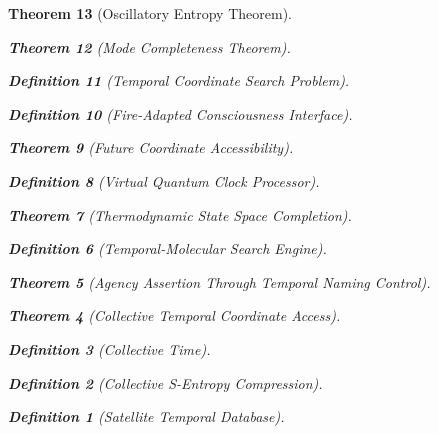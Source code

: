 \documentclass[12pt,a4paper]{article}
\newtheorem{theorem}{Theorem}[section]
\newtheorem{definition}[theorem]{Definition}
\begin{document}
\begin{theorem}[Oscillatory Entropy Theorem]
\begin{theorem}[Mode Completeness Theorem]
\begin{enumerate}
\begin{definition}[Temporal Coordinate Search Problem]
\begin{algorithm}
\begin{definition}[Fire-Adapted Consciousness Interface]
\begin{theorem}[Future Coordinate Accessibility]
\begin{definition}[Virtual Quantum Clock Processor]
\begin{itemize}
\begin{itemize}
\begin{theorem}[Thermodynamic State Space Completion]
\begin{definition}[Temporal-Molecular Search Engine]
\begin{theorem}[Agency Assertion Through Temporal Naming Control]
\begin{remark}
\begin{theorem}[Collective Temporal Coordinate Access]
\begin{definition}[Collective Time]
\begin{definition}[Collective S-Entropy Compression]
\begin{definition}[Satellite Temporal Database]
\begin{algorithm}
\begin{table}[h]
{{\begin{figure}[h]
\end{figure}}}
\end{table}
\end{algorithm}
\end{definition}
\end{definition}
\end{definition}
\end{theorem}
\end{remark}
\end{theorem}
\end{definition}
\end{theorem}
\end{itemize}
\end{itemize}
\end{definition}
\end{theorem}
\end{definition}
\end{algorithm}
\end{definition}
\end{enumerate}
\end{theorem}
\end{theorem}
\end{document}
